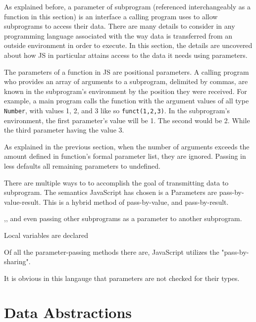 \documentclass[man]{apa}
\begin{document}
As explained before, a parameter of subprogram (referenced interchangeably as a function in this section) is an interface a calling program uses to allow subprograms to access their data. There are many details to consider in any programming language associated with the way data is transferred from an outside environment in order to execute. In this section, the details are uncovered about how JS in particular attains access to the data it needs using parameters.


The parameters of a function in JS are positional parameters. A calling program who provides an array of arguments to a subprogram, delimited by commas, are known in the subprogram's environment by the position they were received. For example, a main program calls the function with the argument values of all type \texttt{Number}, with values 1, 2, and 3 like so \texttt{funct(1,2,3)}. In the subprogram's environment, the first parameter's value will be 1. The second would be 2. While the third parameter having the value 3. 

As explained in the previous section, when the number of arguments exceeds the amount defined in function's formal parameter list, they are ignored. Passing in less defaults all remaining parameters to undefined. 

There are multiple ways to to accomplish the goal of transmitting data to subprogram. The semantics JavaScript has chosen is a  Parameters are pass-by-value-result. This is a hybrid method of pass-by-value, and pass-by-result. 



,, and even passing other subprograms as a parameter to another subprogram.

Local variables are declared

Of all the parameter-passing methods there are, JavaScript utilizes the "pass-by-sharing".

It is obvious in this langauge that parameters are not checked for their types.


\section{Data Abstractions}
\end{document}
